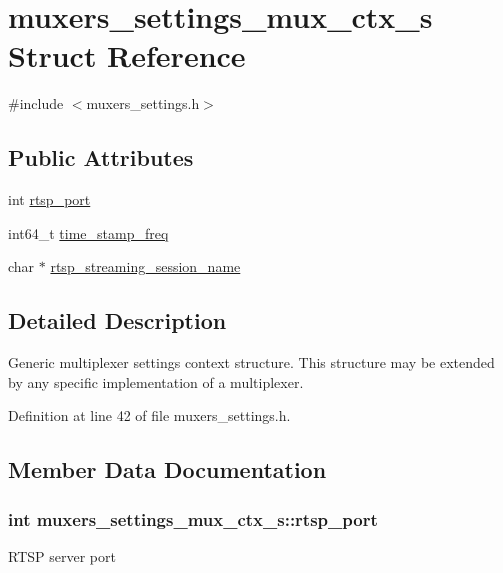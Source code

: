 \hypertarget{structmuxers__settings__mux__ctx__s}{}\section{muxers\+\_\+settings\+\_\+mux\+\_\+ctx\+\_\+s Struct Reference}
\label{structmuxers__settings__mux__ctx__s}


{\ttfamily \#include $<$muxers\+\_\+settings.\+h$>$}

\subsection*{Public Attributes}
\begin{DoxyCompactItemize}
\item 
int \hyperlink{structmuxers__settings__mux__ctx__s_a4976860bc9ab295041312e04f40e2ba6}{rtsp\+\_\+port}
\item 
int64\+\_\+t \hyperlink{structmuxers__settings__mux__ctx__s_a1f6ddfa73781bf1a451982dd7cc5cc36}{time\+\_\+stamp\+\_\+freq}
\item 
char $\ast$ \hyperlink{structmuxers__settings__mux__ctx__s_ac4ef81d53ff9aa0acdd50a65a644c5dc}{rtsp\+\_\+streaming\+\_\+session\+\_\+name}
\end{DoxyCompactItemize}


\subsection{Detailed Description}
Generic multiplexer settings context structure. This structure may be extended by any specific implementation of a multiplexer. 

Definition at line 42 of file muxers\+\_\+settings.\+h.



\subsection{Member Data Documentation}
\subsubsection[{\texorpdfstring{rtsp\+\_\+port}{rtsp_port}}]{\setlength{\rightskip}{0pt plus 5cm}int muxers\+\_\+settings\+\_\+mux\+\_\+ctx\+\_\+s\+::rtsp\+\_\+port}\hypertarget{structmuxers__settings__mux__ctx__s_a4976860bc9ab295041312e04f40e2ba6}{}\label{structmuxers__settings__mux__ctx__s_a4976860bc9ab295041312e04f40e2ba6}
R\+T\+SP server port 


